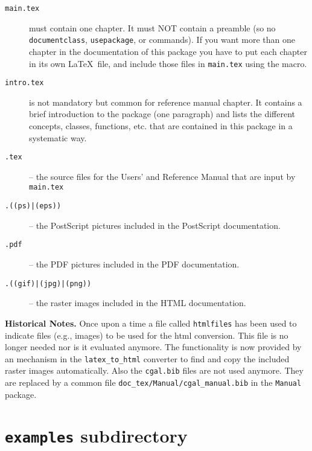 \begin{description}
 \item[{\tt main.tex}]%
       must contain one chapter. It must NOT 
      contain a preamble (so no {\tt documentclass}, {\tt usepackage}, 
      \verb|| or \verb|| commands). 
      If you want more than one chapter in the documentation of this
      package you have to put each chapter in its own \LaTeX\ file,
      and include those files in \texttt{main.tex} using the \verb||
      macro.
 \item[{\tt intro.tex}]%
      is not mandatory but common for reference manual chapter. It
      contains a brief introduction to the package (one paragraph) and
      lists the different concepts, classes, functions, etc. that are
      contained in this package in a systematic way.
 \item[{\tt *.tex}] -- the source files for the Users' and Reference
      Manual that are input by {\tt main.tex} 
 \item[{\tt *.((ps)|(eps))}] -- the PostScript pictures included in
        the PostScript documentation.
 \item[{\tt *.pdf}] -- the PDF pictures included in
        the PDF documentation.
 \item[{\tt *.((gif)|(jpg)|(png))}] -- the raster images included in
        the HTML documentation.
\end{description}

\textbf{Historical Notes.} Once upon a time a file called
\texttt{htmlfiles} has been used to indicate files (e.g., images) to
be used for the html conversion. This file is no longer needed nor is
it evaluated anymore. The functionality is now provided by an
mechanism in the \texttt{latex\_to\_html} converter to find and copy
the included raster images automatically. Also the \texttt{cgal.bib}
files are not used anymore. They are replaced by a common file
\texttt{doc\_tex/Manual/cgal\_manual.bib} in the \texttt{Manual}
package.

\section{{\tt examples} subdirectory}
\label{sec:examples_subdirectory}

